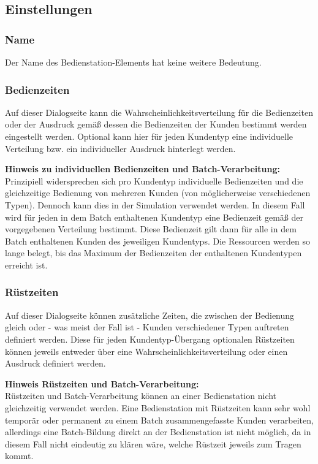 \subsection*{Einstellungen}

\subsubsection*{Name}

Der Name des Bedienstation-Elements hat keine weitere Bedeutung.

\subsubsection*{Bedienzeiten}

Auf dieser Dialogseite kann die Wahrscheinlichkeitsverteilung für die Bedienzeiten oder der Ausdruck gemäß
dessen die Bedienzeiten der Kunden bestimmt werden eingestellt werden. Optional
kann hier für jeden Kundentyp eine individuelle Verteilung bzw. ein individueller Ausdruck hinterlegt werden.

\textbf{Hinweis zu individuellen Bedienzeiten und Batch-Verarbeitung:}~\\
Prinzipiell widersprechen sich pro Kundentyp individuelle Bedienzeiten und die gleichzeitige Bedienung von mehreren Kunden
(von möglicherweise verschiedenen Typen). Dennoch kann dies in der Simulation verwendet werden. In diesem Fall wird für jeden
in dem Batch enthaltenen Kundentyp eine Bedienzeit gemäß der vorgegebenen Verteilung bestimmt. Diese Bedienzeit gilt dann
für alle in dem Batch enthaltenen Kunden des jeweiligen Kundentyps. Die Ressourcen werden so lange belegt, bis das
Maximum der Bedienzeiten der enthaltenen Kundentypen erreicht ist.

\subsubsection*{Rüstzeiten}

Auf dieser Dialogseite können zusätzliche Zeiten, die zwischen der Bedienung gleich oder - was meist der Fall ist -
Kunden verschiedener Typen auftreten definiert werden. Diese für jeden Kundentyp-Übergang optionalen Rüstzeiten
können jeweils entweder über eine Wahrscheinlichkeitsverteilung oder einen Ausdruck definiert werden.

\textbf{Hinweis Rüstzeiten und Batch-Verarbeitung:}~\\
Rüstzeiten und Batch-Verarbeitung können an einer Bedienstation nicht gleichzeitig
verwendet werden. Eine Bedienstation mit Rüstzeiten kann sehr wohl temporär oder permanent
zu einem Batch zusammengefasste Kunden verarbeiten, allerdings eine Batch-Bildung direkt an
der Bedienstation ist nicht möglich, da in diesem Fall nicht eindeutig zu klären wäre,
welche Rüstzeit jeweils zum Tragen kommt.

